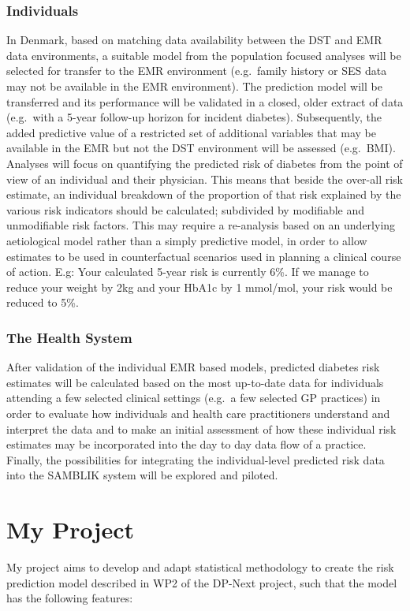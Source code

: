 \documentclass[11pt]{article}
\begin{document}
\subsubsection{Individuals}
\label{sec:org638636a}
In Denmark, based on matching data availability between the DST and EMR data environments, a suitable
model from the population focused analyses will be selected for transfer to the EMR environment
(e.g. family history or SES data may not be available in the EMR environment). The prediction model
will be transferred and its performance will be validated in a closed, older extract of data
(e.g. with a 5-year follow-up horizon for incident diabetes). Subsequently, the added predictive
value of a restricted set of additional variables that may be available in the EMR but not the DST
environment will be assessed (e.g. BMI). Analyses will focus on quantifying the predicted risk of
diabetes from the point of view of an individual and their physician. This means that beside the
over-all risk estimate, an individual breakdown of the proportion of that risk explained by the
various risk indicators should be calculated; subdivided by modifiable and unmodifiable risk factors.
This may require a re-analysis based on an underlying aetiological model rather than a simply
predictive model, in order to allow estimates to be used in counterfactual scenarios used in planning
a clinical course of action. E.g: Your calculated 5-year risk is currently 6\%. If we manage to reduce
your weight by 2kg and your HbA1c by 1 mmol/mol, your risk would be reduced to 5\%.

\subsubsection{The Health System}
\label{sec:org5adf967}
After validation of the individual EMR based models, predicted diabetes risk estimates will be
calculated based on the most up-to-date data for individuals attending a few selected clinical
settings (e.g. a few selected GP practices) in order to evaluate how individuals and health care
practitioners understand and interpret the data and to make an initial assessment of how these
individual risk estimates may be incorporated into the day to day data flow of a practice. Finally,
the possibilities for integrating the individual-level predicted risk data into the SAMBLIK system
will be explored and piloted.

\section{My Project}
\label{sec:org89baff9}
My project aims to develop and adapt statistical methodology to create the risk prediction model
described in WP2 of the DP-Next project, such that the model has the following features:
\end{document}
